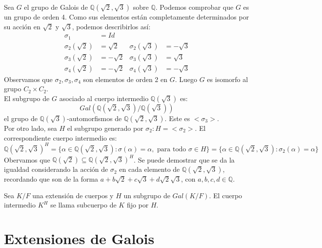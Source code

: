 \begin{example}
    Sea $G$ el grupo de Galois de $\mathbb{Q}(\sqrt{2}, \sqrt{3})$ sobre $\mathbb{Q}$.
    Podemos comprobar que $G$ es un grupo de orden 4.
    Como sus elementos están completamente determinados por su acción en $\sqrt{2}$ y $\sqrt{3}$, podemos describirlos así:
    \begin{align*}
        \sigma_1           & = Id                                           \\
        \sigma_2(\sqrt{2}) & = \sqrt{2}  & \sigma_2(\sqrt{3}) & = -\sqrt{3} \\
        \sigma_3(\sqrt{2}) & = -\sqrt{2} & \sigma_3(\sqrt{3}) & = \sqrt{3}  \\
        \sigma_4(\sqrt{2}) & = -\sqrt{2} & \sigma_4(\sqrt{3}) & = -\sqrt{3}
    \end{align*}
    Observamos que $\sigma_2, \sigma_3, \sigma_4$ son elementos de orden 2 en $G$.
    Luego $G$ es isomorfo al grupo $C_2 \times C_2$.\\
    El subgrupo de $G$ asociado al cuerpo intermedio $\mathbb{Q}(\sqrt{3})$ es:
    $$Gal(\mathbb{Q}(\sqrt{2}, \sqrt{3}) / \mathbb{Q}(\sqrt{3}))$$
    el grupo de $\mathbb{Q}(\sqrt{3})$-automorfismos de $\mathbb{Q}(\sqrt{2}, \sqrt{3})$. Este es $< \sigma_3 >$.\\
    Por otro lado, sea $H$ el subgrupo generado por $\sigma_2 : H = < \sigma_2 >$.
    El correspondiente cuerpo intermedio es:
    $$\mathbb{Q}(\sqrt{2}, \sqrt{3})^H = \{ \alpha \in \mathbb{Q}(\sqrt{2}, \sqrt{3}) : \sigma(\alpha) = \alpha, \text{ para todo } \sigma \in H \} = \{ \alpha \in \mathbb{Q}(\sqrt{2}, \sqrt{3}) : \sigma_2(\alpha) = \alpha \}$$
    Obervamos que $\mathbb{Q}(\sqrt{2}) \subseteq \mathbb{Q}(\sqrt{2}, \sqrt{3})^H$.
    Se puede demostrar que se da la igualdad considerando la acción de $\sigma_2$ en cada elemento de $\mathbb{Q}(\sqrt{2}, \sqrt{3})$, recordando que son de la forma $a + b\sqrt{2} + c\sqrt{3} + d\sqrt{2}\sqrt{3}$, con $a, b, c, d \in \mathbb{Q}$.
\end{example}

\begin{definition}
    Sea $K/F$ una extensión de cuerpos y $H$ un subgrupo de $Gal(K/F)$.
    El cuerpo intermedio $K^H$ se llama subcuerpo de $K$ fijo por $H$.
\end{definition}

\section{Extensiones de Galois}

